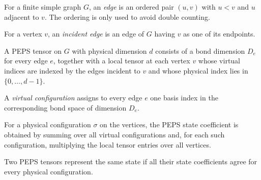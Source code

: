 \begin{definition}
    \label{def:peps_edge}
    \leanok
    For a finite simple graph $G$, an \emph{edge} is an ordered pair
    $(u,v)$ with $u < v$ and $u$ adjacent to $v$.
    The ordering is only used to avoid double counting.
\end{definition}

\begin{definition}
    \label{def:peps_incident_edge}
    \leanok
    For a vertex $v$, an \emph{incident edge} is an edge of $G$ having $v$
    as one of its endpoints.
\end{definition}

\begin{definition}
    \label{def:peps_tensor}
    \leanok
    A PEPS tensor on $G$ with physical dimension $d$ consists of a bond
    dimension $D_e$ for every edge $e$, together with a local tensor at each
    vertex $v$ whose virtual indices are indexed by the edges incident to $v$
    and whose physical index lies in $\{0,\ldots,d-1\}$.
\end{definition}

\begin{definition}
    \label{def:peps_virtual_config}
    \leanok
    A \emph{virtual configuration} assigns to every edge $e$ one basis index in
    the corresponding bond space of dimension $D_e$.
\end{definition}

\begin{definition}
    \label{def:peps_stateCoeff}
    \leanok
    For a physical configuration $\sigma$ on the vertices, the PEPS state
    coefficient is obtained by summing over all virtual configurations and,
    for each such configuration, multiplying the local tensor entries over all
    vertices.
\end{definition}

\begin{definition}
    \label{def:peps_same_state}
    \leanok
    Two PEPS tensors represent the same state if all their state coefficients
    agree for every physical configuration.
\end{definition}

